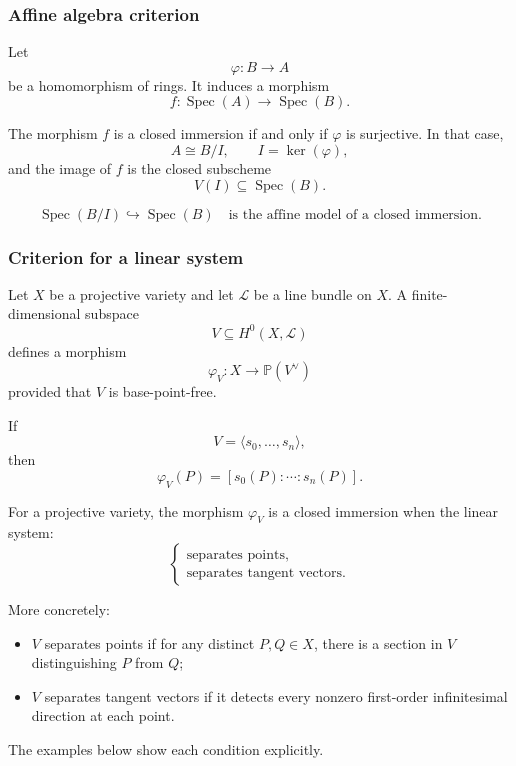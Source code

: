 \documentclass[12pt,a4paper]{article}
\theoremstyle{notespace}
\begin{document}
\subsubsection{Affine algebra criterion}

Let
\[
\varphi:B\longrightarrow A
\]
be a homomorphism of rings. It induces a morphism
\[
f:\operatorname{Spec}(A)\longrightarrow \operatorname{Spec}(B).
\]

The morphism \(f\) is a closed immersion if and only if \(\varphi\) is surjective. In that case,
\[
A\cong B/I,
\qquad
I=\ker(\varphi),
\]
and the image of \(f\) is the closed subscheme
\[
V(I)\subseteq \operatorname{Spec}(B).
\]

\[
\boxed{
	\operatorname{Spec}(B/I)\hookrightarrow \operatorname{Spec}(B)
	\quad\text{is the affine model of a closed immersion.}
}
\]

\subsubsection{Criterion for a linear system}

Let \(X\) be a projective variety and let \(\mathcal{L}\) be a line bundle on \(X\). A finite-dimensional subspace
\[
V\subseteq H^{0}(X,\mathcal{L})
\]
defines a morphism
\[
\varphi_{V}:X\longrightarrow \mathbb{P}(V^{\vee})
\]
provided that \(V\) is base-point-free.

If
\[
V=\langle s_{0},\ldots,s_{n}\rangle,
\]
then
\[
\varphi_{V}(P)
=
[s_{0}(P):\cdots:s_{n}(P)].
\]

For a projective variety, the morphism \(\varphi_{V}\) is a closed immersion when the linear system:
\[
\begin{cases}
	\text{separates points,}\\
	\text{separates tangent vectors.}
\end{cases}
\]

More concretely:

\begin{itemize}
	\item \(V\) separates points if for any distinct \(P,Q\in X\), there is a section in \(V\) distinguishing \(P\) from \(Q\);
	\item \(V\) separates tangent vectors if it detects every nonzero first-order infinitesimal direction at each point.
\end{itemize}

The examples below show each condition explicitly.

\end{document}
